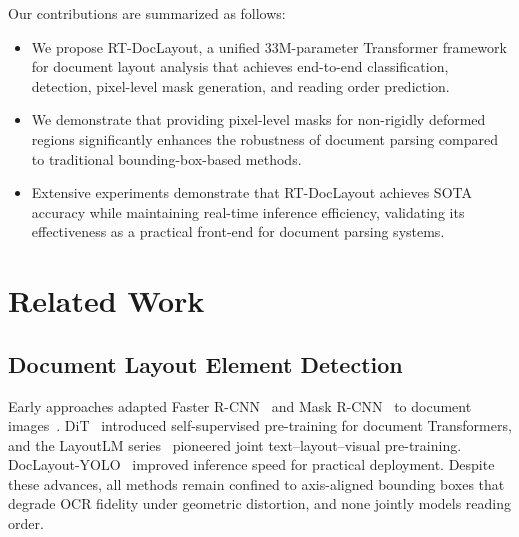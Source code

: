 \documentclass[11pt, a4paper,logo,  copyright, nonumbering]{paddleocr}
\begin{document}
Our contributions are summarized as follows:

\begin{itemize}
    \item We propose RT-DocLayout, a unified 33M-parameter Transformer framework for document layout analysis that achieves end-to-end classification, detection, pixel-level mask generation, and reading order prediction.
    
    \item We demonstrate that providing pixel-level masks for non-rigidly deformed regions significantly enhances the robustness of document parsing compared to traditional bounding-box-based methods.

    \item Extensive experiments demonstrate that RT-DocLayout achieves SOTA accuracy while maintaining real-time inference efficiency, validating its effectiveness as a practical front-end for document parsing systems.
\end{itemize}

\section{Related Work}
\label{sec:related}


\subsection{Document Layout Element Detection}

Early approaches adapted Faster R-CNN~\cite{ren2016fasterrcnnrealtimeobject} and Mask R-CNN~\cite{he2018maskrcnn} to document images~\cite{zhong2019publaynetlargestdatasetdocument, shen2021layoutparserunifiedtoolkitdeep}. DiT~\cite{li2022ditselfsupervisedpretrainingdocument} introduced self-supervised pre-training for document Transformers, and the LayoutLM series~\cite{xu2020layoutlm, xu2022layoutlmv2multimodalpretrainingvisuallyrich, huang2022layoutlmv3pretrainingdocumentai} pioneered joint text--layout--visual pre-training. DocLayout-YOLO~\cite{zhao2024doclayoutyoloenhancingdocumentlayout} improved inference speed for practical deployment. Despite these advances, all methods remain confined to axis-aligned bounding boxes that degrade OCR fidelity under geometric distortion, and none jointly models reading order.
\end{document}
